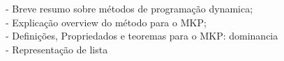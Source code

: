 - Breve resumo sobre métodos de programação dynamica; \\
- Explicação overview do método para o MKP; \\
- Definições, Propriedados e teoremas para o MKP: dominancia \\
- Representação de lista
